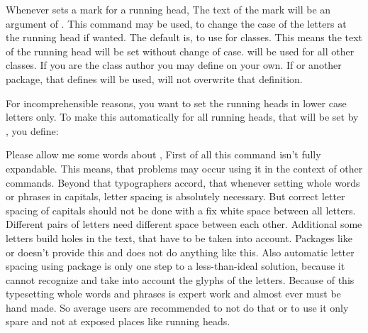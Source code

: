 \begin{Declaration}
\end{Declaration}
Whenever  sets a mark for a running head, The text of the
mark will be an argument of . This command may be used, to
change the case of the letters at the running head if wanted. The default is,
to use
 for
\KOMAScript{} classes. This means the text of the running head will be set
without change of case.
will be used for all other classes. If you are the class author you may define
 on your own. If  or another package,
that defines  will be used,  will not
overwrite that definition.
\begin{Example}
  For incomprehensible reasons, you want to set the running heads in lower
  case letters only. To make this automatically for all running heads, that
  will be set by , you define:
\begin{lstcode}
  \let\MakeMarkcase\MakeLowercase
\end{lstcode}
\end{Example}
Please allow me some words about
, First of all this command isn't
fully expandable. This means, that problems may occur using it in the context
of other commands. Beyond that typographers accord, that whenever setting
whole words or phrases in capitals, letter spacing is absolutely
necessary. But correct letter spacing of capitals should not be done with a
fix white space between all letters. Different pairs of letters need different
space between each other. Additional some letters build holes in the text,
that have to be taken into account. Packages like  or
 doesn't provide this and  does not do
anything like this. Also automatic letter spacing using package
 is only one step to a less-than-ideal solution, because it
cannot recognize and take into account the glyphs of the letters. Because of
this typesetting whole words and phrases is expert work
and almost ever must be hand made. So average users are recommended to not do
that or to use it only spare and not at exposed places like running heads.%
\EndIndexGroup


